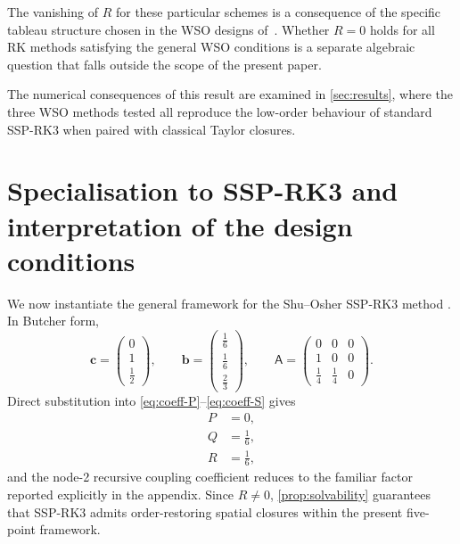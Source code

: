 \documentclass[review,hidelinks,onefignum,onetabnum]{siamart251216}
\begin{document}
\begin{remark}
The vanishing of $R$ for these particular schemes is a consequence of the specific tableau structure chosen in the WSO designs of~\cite{Biswas2023,Biswas2024}. Whether $R=0$ holds for all RK methods satisfying the general WSO conditions is a separate algebraic question that falls outside the scope of the present paper.
\end{remark}

The numerical consequences of this result are examined in \cref{sec:results}, where the three WSO methods tested all reproduce the low-order behaviour of standard SSP-RK3 when paired with classical Taylor closures.

\section{Specialisation to SSP-RK3 and interpretation of the design conditions}
\label{sec:ssprk3}

We now instantiate the general framework for the Shu--Osher SSP-RK3 method \cite{ShuOsher1988}. In Butcher form,
\begin{equation}
  \mathbf{c} = \begin{pmatrix}0\\1\\\tfrac{1}{2}\end{pmatrix},
  \qquad
  \mathbf{b} = \begin{pmatrix}\tfrac{1}{6}\\\tfrac{1}{6}\\\tfrac{2}{3}\end{pmatrix},
  \qquad
  \mathsf{A} =
  \begin{pmatrix}
    0 & 0 & 0\\
    1 & 0 & 0\\
    \tfrac{1}{4} & \tfrac{1}{4} & 0
  \end{pmatrix}.
  \label{eq:ssprk3-tableau}
\end{equation}
Direct substitution into \eqref{eq:coeff-P}--\eqref{eq:coeff-S} gives
\begin{align}
  P &= 0,
  \label{eq:P-val}\\
  Q &= \frac{1}{6},
  \label{eq:Q-val}\\
  R &= \frac{1}{6},
  \label{eq:R-val}
\end{align}
and the node-2 recursive coupling coefficient reduces to the familiar factor reported explicitly in the appendix. Since $R\neq 0$, \cref{prop:solvability} guarantees that SSP-RK3 admits order-restoring spatial closures within the present five-point framework.
\end{document}
